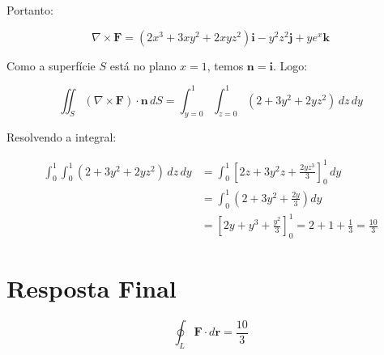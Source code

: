 \documentclass[a4paper,12pt]{article}
\begin{document}
\begin{flushleft}
Portanto:

\begin{equation}
\nabla \times \mathbf{F} = (2x^3 + 3x y^2 + 2x y z^2)\mathbf{i} - y^2 z^2 \mathbf{j} + y e^x \mathbf{k}
\end{equation}

Como a superfície $S$ está no plano $x = 1$, temos $\mathbf{n} = \mathbf{i}$. Logo:

\begin{equation}
\iint_S (\nabla \times \mathbf{F}) \cdot \mathbf{n} \, dS = \int_{y=0}^{1} \int_{z=0}^{1} (2 + 3y^2 + 2y z^2) \, dz\, dy
\end{equation}

Resolvendo a integral:

\begin{align}
\int_0^1 \int_0^1 (2 + 3y^2 + 2y z^2)\, dz\, dy 
&= \int_0^1 \left[2z + 3y^2 z + \frac{2y z^3}{3} \right]_0^1 \, dy \\
&= \int_0^1 \left(2 + 3y^2 + \frac{2y}{3} \right) dy \\
&= \left[2y + y^3 + \frac{y^2}{3} \right]_0^1 = 2 + 1 + \frac{1}{3} = \frac{10}{3}
\end{align}

\section*{Resposta Final}

\begin{equation}
\boxed{
\oint_L \mathbf{F} \cdot d\mathbf{r} = \frac{10}{3}
}
\end{equation}

\end{flushleft}
\end{document}
